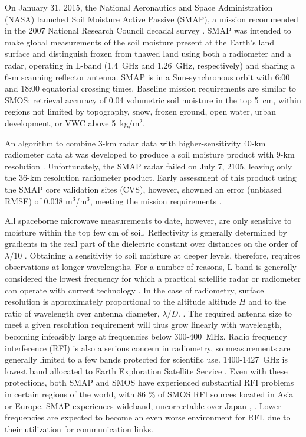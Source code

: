 \documentclass[draftcls,onecolumn]{IEEEtran}  %
\begin{document}
On January 31, 2015, the National Aeronautics and Space Administration (NASA) launched Soil Moisture Active Passive (SMAP), a mission recommended in the 2007  National Research Council decadal survey \cite{national2007earth}.
SMAP was intended to  make global measurements of the soil moisture present at the Earth's land surface and distinguish frozen from thawed land using both a radiometer and a radar,  operating in L-band (1.4~GHz and 1.26~GHz, respectively) and sharing a 6-m scanning reflector antenna.
SMAP is in a Sun-synchronous orbit with 6:00 and 18:00 equatorial crossing times.  
Baseline mission requirements are similar to SMOS; retrieval accuracy of 0.04 volumetric soil moisture in the top 5~cm, within regions not limited by topography, snow, frozen ground, open water,  urban development, or VWC above 5~kg/m$^2$. 


An algorithm to combine 3-km  radar data with higher-sensitivity 40-km radiometer data at was developed to produce a soil moisture product with 9-km resolution \cite{Entekhabi:2010}. 
Unfortunately, the SMAP radar failed on July 7, 2105, leaving only the 36-km resolution radiometer product.  
Early assessment of this product using the SMAP core validation sites (CVS), however, 
 showned an error (unbiased RMSE) of 0.038 m${}^3$/m${}^3$, meeting the mission requirements \cite{Chan2016}. 




All spaceborne microwave measurements to date, however, are only sensitive to moisture within the top few cm of soil.
Reflectivity is generally determined by gradients in the real part of the dielectric constant over distances on the order of $\lambda/10$ \cite{Wilheit1978}. 
Obtaining a sensitivity to soil moisture at deeper levels, therefore,  requires observations at longer wavelengths. 
For a number of reasons, L-band is generally considered the lowest frequency for which a practical satellite radar or radiometer can operate with current technology \cite{Kerr2007a}.
In the case of radiometry, surface resolution is approximately proportional to the altitude altitude $H$ and to the ratio of wavelength over antenna diameter, $\lambda / D$.
\cite{Schmugge1976}. 
The required antenna size to meet a given resolution requirement will thus grow linearly with wavelength, becoming infeasibly large at frequencies below 300-400~MHz. 
Radio frequency interference (RFI) is also a serious concern in radiometry, so measurements are generally limited to a few bands protected for scientific use. 
1400-1427~GHz is lowest band  allocated to Earth Exploration Satellite Service  \cite{Oliva2012}.
Even with these protections, both SMAP and SMOS have experienced substantial RFI problems in certain regions of the world, with 86 \% of SMOS RFI sources located in Asia or Europe.  SMAP experiences wideband, uncorrectable over  Japan  \cite{Oliva2012}, \cite{Mohammed2016}.   
Lower frequencies are expected to become an even worse environment for RFI, due to their utilization for communication links. 
\end{document}
